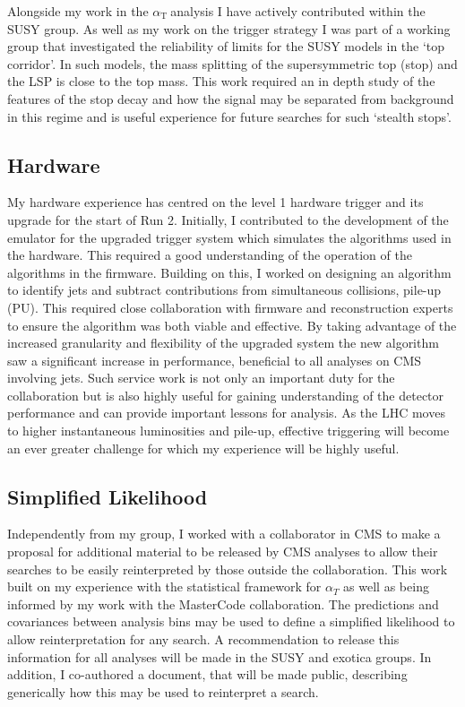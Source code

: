 \documentclass[11pt]{article}
\theoremstyle{plain} \numberwithin{equation}{section}
\theoremstyle{definition}
\DeclareRobustCommand{\alphat}{$\alpha_{\text{T}}~$}
\begin{document}
Alongside my work in the \alphat analysis I have actively contributed within the SUSY group.
As well as my work on the trigger strategy I was part of a working group that investigated
the reliability of limits for the SUSY models in the `top corridor'. In such models, the mass splitting
of the supersymmetric top (stop) and the LSP is close to the top mass. This work required an in 
depth study of the features of the stop decay and how the signal may be separated from 
background in this regime and is useful experience for future searches for such `stealth stops'.

\subsection*{Hardware}
My hardware experience has centred on the level 1 hardware trigger and its
upgrade for the start of Run 2. Initially, I contributed to the development of the emulator for the upgraded
trigger system which simulates the algorithms used in the hardware. This required a good understanding
of the operation of the algorithms in the firmware. Building on this, 
I worked on designing an algorithm to identify jets and subtract contributions from simultaneous collisions, 
pile-up (PU). This required close collaboration with firmware and reconstruction experts to ensure the algorithm was 
both viable and effective. By taking advantage of the increased granularity and flexibility of the 
upgraded system the new algorithm saw a significant increase in performance, beneficial
to all analyses on CMS involving jets. Such service work is not only an important duty for the collaboration but is also
highly useful for gaining understanding of the detector performance and
can provide important lessons for analysis. As the LHC moves to higher instantaneous 
luminosities and pile-up, effective triggering will become an ever greater challenge 
for which my experience will be highly useful. 

\subsection*{Simplified Likelihood}
Independently from my group, I worked with a collaborator in CMS to make a proposal 
for additional material to be released by CMS analyses
to allow their searches to be easily reinterpreted by those outside the collaboration. 
This work built on my experience with the statistical framework for $\alpha_T$ as well as being 
informed by my work with the MasterCode collaboration. The predictions and covariances between analysis bins may be used
to define a simplified likelihood to allow reinterpretation for any search. 
A recommendation to release this information for all analyses
will be made in the SUSY and exotica groups. In addition, I co-authored a document,
that will be made public, describing generically how this may be used to reinterpret a search.
\end{document}
